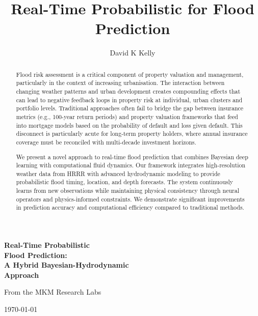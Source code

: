\documentclass{article}
\title{ Real-Time Probabilistic for Flood Prediction}
\author{David K Kelly}
\date{}
\begin{document}
\begin{titlepage}
\begin{center}

\vspace*{2cm}

\begin{figure}\centering
{}
\end{figure}

\vspace{2cm}

{\Huge\bfseries Real-Time Probabilistic\\Flood Prediction:\\ A Hybrid Bayesian-Hydrodynamic\\Approach\par}

\vspace{2cm}

{\Large From the MKM Research Labs\par}

\vspace{1cm}

{\large \today\par}

\end{center}
\end{titlepage}

\begin{abstract}
Flood risk assessment is a critical component of property valuation and management, particularly in the context of increasing urbanisation. The interaction between changing weather patterns and urban development creates compounding effects that can lead to negative feedback loops in property risk at individual, urban clusters and portfolio levels. Traditional approaches often fail to bridge the gap between insurance metrics (e.g., 100-year return periods) and property valuation frameworks that feed into mortgage models based on the probability of default and loss given default. This disconnect is particularly acute for long-term property holders, where annual insurance coverage must be reconciled with multi-decade investment horizons.

We present a novel approach to real-time flood prediction that combines Bayesian deep learning with computational fluid dynamics. Our framework integrates high-resolution weather data from HRRR with advanced hydrodynamic modeling to provide probabilistic flood timing, location, and depth forecasts. The system continuously learns from new observations while maintaining physical consistency through neural operators and physics-informed constraints. We demonstrate significant improvements in prediction accuracy and computational efficiency compared to traditional methods.
\end{abstract}
\end{document}
